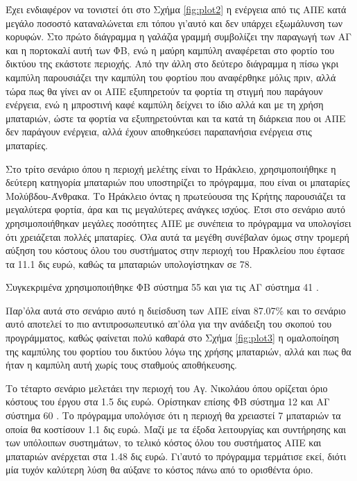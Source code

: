 \documentclass[12pt]{report}
\begin{document}
Έχει ενδιαφέρον να τονιστεί ότι στο Σχήμα \ref{fig:plot2} η ενέργεια από τις ΑΠΕ κατά μεγάλο ποσοστό καταναλώνεται επι τόπου γι'αυτό και δεν υπάρχει εξωμάλυνση των κορυφών. Στο πρώτο διάγραμμα η γαλάζια γραμμή συμβολίζει την
παραγωγή των ΑΓ και η πορτοκαλί αυτή των ΦΒ, ενώ η μαύρη καμπύλη αναφέρεται στο φορτίο του δικτύου της εκάστοτε περιοχής. Από την άλλη στο δεύτερο διάγραμμα η πίσω γκρι καμπύλη παρουσιάζει την καμπύλη του φορτίου που αναφέρθηκε
μόλις πριν, αλλά τώρα πως θα γίνει αν οι ΑΠΕ εξυπηρετούν τα φορτία τη στιγμή που παράγουν ενέργεια, ενώ η μπροστινή καφέ καμπύλη δείχνει το ίδιο αλλά και με τη χρήση μπαταριών, ώστε τα φορτία να εξυπηρετούνται και τα κατά τη
διάρκεια που οι ΑΠΕ δεν παράγουν ενέργεια, αλλά έχουν αποθηκεύσει παραπανήσια ενέργεια στις μπαταρίες.

Στο τρίτο σενάριο όπου η περιοχή μελέτης είναι το Ηράκλειο, χρησιμοποιήθηκε η δεύτερη κατηγορία μπαταριών που υποστηρίζει το πρόγραμμα, που είναι οι μπαταρίες Μολύβδου-Άνθρακα. Το Ηράκλειο όντας η πρωτεύουσα της Κρήτης παρουσιάζει
τα μεγαλύτερα φορτία, άρα και τις μεγαλύτερες ανάγκες ισχύος. Έτσι στο σενάριο αυτό χρησιμοποιήθηκαν μεγάλες ποσότητες ΑΠΕ με συνέπεια το πρόγραμμα να υπολογίσει ότι χρειάζεται πολλές μπαταρίες. 
Όλα αυτά τα μεγέθη συνέβαλαν όμως στην τρομερή αύξηση του κόστους όλου του συστήματος στην περιοχή του Ηρακλείου που έφτασε τα 11.1 δις ευρώ, καθώς τα {} μπαταριών υπολογίστηκαν σε 78. 

Συγκεκριμένα χρησιμοποιήθηκε ΦΒ σύστημα 55 {} και για τις ΑΓ σύστημα 41 {}.

Παρ'όλα αυτά στο σενάριο αυτό η διείσδυση των ΑΠΕ είναι 87.07\% και το σενάριο αυτό αποτελεί το πιο αντιπροσωπευτικό απ'όλα για την ανάδειξη του σκοπού του προγράμματος, καθώς φαίνεται πολύ καθαρά στο Σχήμα 
\ref{fig:plot3} η ομαλοποίηση της καμπύλης του φορτίου του δικτύου λόγω της χρήσης μπαταριών, αλλά και πως θα ήταν η καμπύλη αυτή χωρίς τους σταθμούς αποθήκευσης.

\begin{center}
\end{center}

Το τέταρτο σενάριο μελετάει την περιοχή του Αγ. Νικολάου όπου ορίζεται όριο κόστους του έργου στα 1.5 δις ευρώ. Ορίστηκαν επίσης ΦΒ σύστημα 12 {} και ΑΓ σύστημα 60 {}. Το πρόγραμμα υπολόγισε ότι η
περιοχή θα χρειαστεί 7 {} μπαταριών τα οποία θα κοστίσουν 1.1 δις ευρώ. Μαζί με τα έξοδα λειτουργίας και συντήρησης και των υπόλοιπων συστημάτων, το τελικό κόστος όλου του συστήματος ΑΠΕ και μπαταριών ανέρχεται στα
1.48 δις ευρώ. Γι'αυτό το πρόγραμμα τερμάτισε εκεί, διότι μία τυχόν καλύτερη λύση θα αύξανε το κόστος πάνω από το ορισθέντα όριο.
\end{document}
